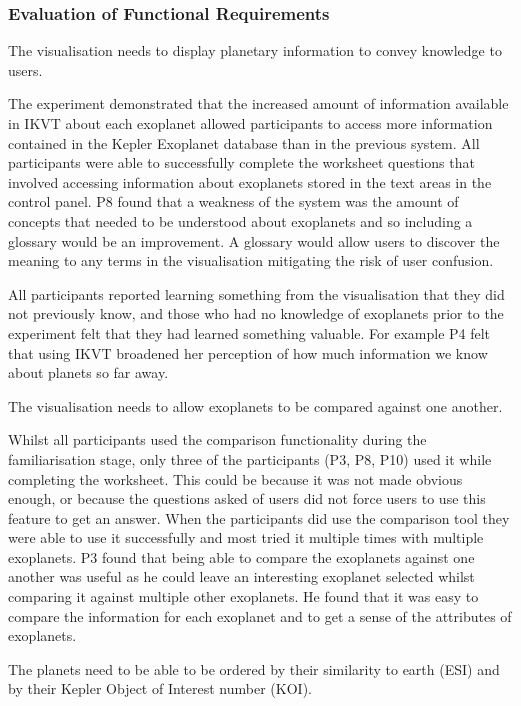 \subsubsection{Evaluation of Functional Requirements}
\begin{enumerate}
{\bf
 \item[R1.] The visualisation needs to display planetary information to convey
knowledge to users.}

The experiment demonstrated that the increased amount of information available
in IKVT
 about each exoplanet allowed participants to access
more information contained in the Kepler Exoplanet database than in the previous
system. All participants were able to successfully complete the worksheet
questions
that involved accessing information about exoplanets stored in the
text areas in the control panel.
P8 found that a weakness of the system was the amount of concepts that needed
to be understood about exoplanets and so including a glossary would be an
improvement. A glossary would allow users to discover the meaning to any terms
in the visualisation mitigating the risk of user
confusion.

All participants reported learning something from the visualisation that they
did not previously know, and those who had no knowledge of exoplanets prior to
the experiment felt that they had learned something valuable. For example P4
felt that using IKVT broadened her perception of how much information we know
about planets so far away.


{\bf
 \item[R2.] The visualisation needs to allow exoplanets to be compared against
one another.}

Whilst all participants used the comparison functionality during the
familiarisation stage, only three of the participants (P3, P8, P10) used it
while completing the
worksheet. This could be because it was not made obvious enough, or because the
questions asked of users did not force users to use this feature to get an
answer. When the participants did use the comparison tool they were able to use
it successfully and most tried it multiple times with multiple exoplanets. P3
found that being able to compare the exoplanets against one another was useful
as he could leave an interesting exoplanet selected whilst comparing it against
multiple other exoplanets. He found that it was easy to compare the information
for each exoplanet and to get a sense of the attributes of exoplanets.

{\bf
 \item[R3.] The planets need to be able to be ordered by their similarity to
earth (ESI) and by their Kepler Object of Interest number (KOI).}
 

\end{enumerate}

